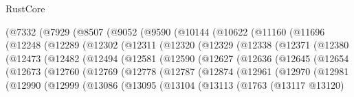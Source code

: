 \begin{lexlean}{RustCore}
\begin{coremodule}
        (@7332
          (@7929
            (@8507
              (@9052
                (@9590
                  (@10144
                    (@10622
                      (@11160
                        (@11696
                          (@12248
                            (@12289
                              (@12302
                                (@12311
                                  (@12320
                                    (@12329
                                      (@12338
                                        (@12371
                                          (@12380
                                            (@12473
                                              (@12482
                                                (@12494
                                                  (@12581
                                                    (@12590
                                                      (@12627
                                                        (@12636
                                                          (@12645
                                                            (@12654
                                                              (@12673
                                                                (@12760
                                                                  (@12769
                                                                    (@12778
                                                                      (@12787
                                                                        (@12874
                                                                          (@12961
                                                                            (@12970
                                                                              (@12981
                                                                                (@12990
                                                                                  (@12999
                                                                                    (@13086
                                                                                      (@13095
                                                                                        (@13104
                                                                                          (@13113
                                                                                            (@1763
                                                                                              (@13117
                                                                                                @13120)

\end{coremodule}
\end{lexlean}
